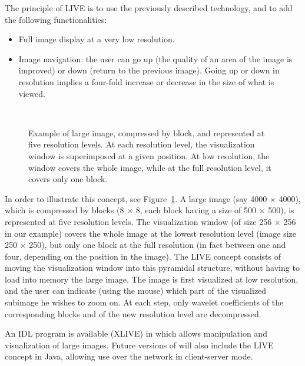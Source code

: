 The principle of LIVE is to use the previously described technology, and
to add the following functionalities:
\begin{itemize}
\item Full image display at a very low resolution.
\item Image navigation: the user can go up (the quality of an area of the 
image is improved) or down (return to the previous image). 
Going up or down in resolution implies a four-fold increase or decrease
  in the size of what is viewed.
\end{itemize}

\begin{figure}[htb]
\centerline{
\hbox{
}}
\caption{Example of large image, compressed by block, and represented at five
resolution levels. At each resolution level, the visualization window is 
superimposed at a given position. At low resolution, the window covers the
whole image, while at the full resolution level, it covers only one block.}
\label{fig_live}
\end{figure}

In order to illustrate this concept, see Figure~\ref{fig_live}.
A large image (say 4000 $\times$ 4000),  
which is compressed by blocks (8 $\times$ 8, each block having a 
size of 500 $\times$ 500),  
is represented at five resolution levels.
The visualization window (of size 256 $\times$ 256 in our example) 
covers the whole
image at the lowest resolution level (image size 250 $\times$ 250), 
but only one block 
at the full resolution (in fact between one and four, 
depending on the
position in the image). The LIVE concept consists of moving the visualization
window into this pyramidal structure, without having to load into memory the
large image. The image is first visualized at low resolution, and the user
can indicate (using the mouse) which part of the visualized subimage he
wishes to zoom on. At each step, only wavelet coefficients of the 
corresponding blocks
and of the new resolution level are decompressed.  

An IDL program is available (XLIVE) in \proj which allows manipulation and  
visualization of large images. Future versions of \proj will also 
include the LIVE
concept in Java, allowing use over the network in client-server mode.


\clearpage
\newpage

